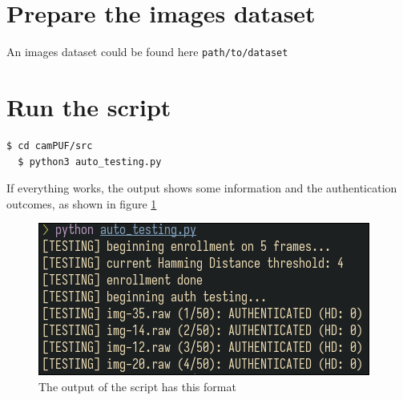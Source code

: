 \section{Prepare the images dataset}\label{sec:preparetheimagedataset}
An images dataset could be found here
\texttt{path/to/dataset}

\section{Run the script}\label{sec:runthescript}
\begin{lstlisting}[language=bash]
  $ cd camPUF/src
  $ python3 auto_testing.py
\end{lstlisting}

If everything works, the output shows some information and the authentication outcomes, as shown in figure \ref{fig:resultimg}

\begin{figure}[h!]
	\vspace{0.5cm}
	\includegraphics[width=\textwidth]{images/auto_testing_output.png}
	\caption{The output of the script has this format}
	\label{fig:resultimg}
\end{figure}
